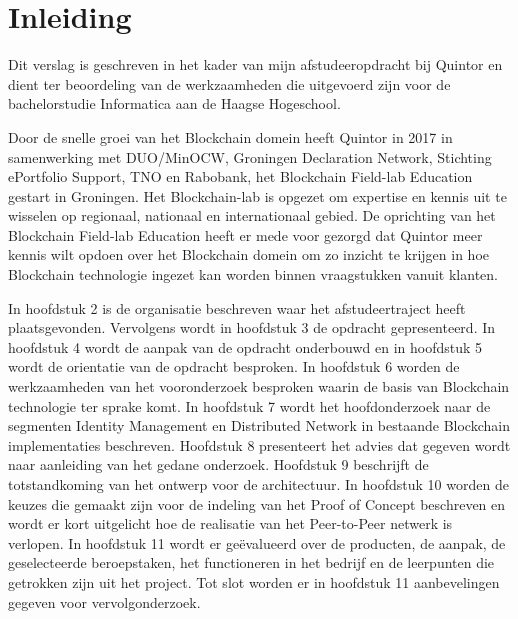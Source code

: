 \chapter{Inleiding}

Dit verslag is geschreven in het kader van mijn afstudeeropdracht bij Quintor en dient ter beoordeling van de werkzaamheden die uitgevoerd zijn voor de bachelorstudie Informatica aan de Haagse Hogeschool. 

Door de snelle groei van het Blockchain domein heeft Quintor in 2017 in samenwerking met DUO/MinOCW, Groningen Declaration Network, Stichting ePortfolio Support, TNO en Rabobank, het Blockchain Field-lab Education gestart in Groningen. Het Blockchain-lab is opgezet om expertise en kennis uit te wisselen op regionaal, nationaal en internationaal gebied. De oprichting van het Blockchain Field-lab Education heeft er mede voor gezorgd dat Quintor meer kennis wilt opdoen over het Blockchain domein om zo inzicht te krijgen in hoe Blockchain technologie ingezet kan worden binnen vraagstukken vanuit klanten. 

In hoofdstuk 2 is de organisatie beschreven waar het afstudeertraject heeft plaatsgevonden. Vervolgens wordt in hoofdstuk 3 de opdracht gepresenteerd. In hoofdstuk 4 wordt de aanpak van de opdracht onderbouwd en in hoofdstuk 5 wordt de orientatie van de opdracht besproken. In hoofdstuk 6 worden de werkzaamheden van het vooronderzoek besproken waarin de basis van Blockchain technologie ter sprake komt. In hoofdstuk 7 wordt het hoofdonderzoek naar de segmenten Identity Management en Distributed Network in bestaande Blockchain implementaties beschreven. Hoofdstuk 8 presenteert het advies dat gegeven wordt naar aanleiding van het gedane onderzoek. Hoofdstuk 9 beschrijft de totstandkoming van het ontwerp voor de architectuur. In hoofdstuk 10 worden de keuzes die gemaakt zijn voor de indeling van het Proof of Concept beschreven en wordt er kort uitgelicht hoe de realisatie van het Peer-to-Peer netwerk is verlopen. In hoofdstuk 11 wordt er geëvalueerd over de producten, de aanpak, de geselecteerde beroepstaken, het functioneren in het bedrijf en de leerpunten die getrokken zijn uit het project. Tot slot worden er in hoofdstuk 11 aanbevelingen gegeven voor vervolgonderzoek.
